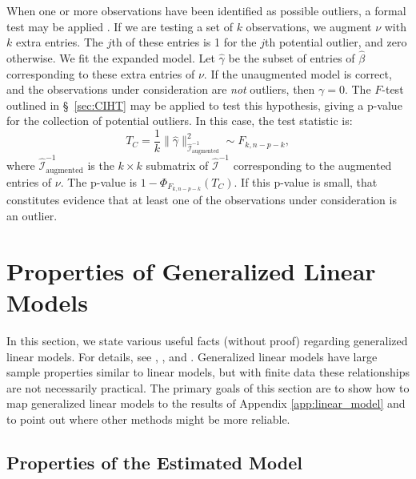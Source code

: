 \documentclass[12pt]{article}
\begin{document}
When one or more observations have been identified as possible outliers, a formal test may be applied \cite[\S~10.6.4]{Seber:2003}. If we are testing a set of $k$ observations, we augment $\nu$ with $k$ extra entries. The $j$th of these entries is 1 for the $j$th potential outlier, and zero otherwise. We fit the expanded model. Let $\hat{\gamma}$ be the subset of entries of $\hat{\beta}$ corresponding to these extra entries of $\nu$. If the unaugmented model is correct, and the observations under consideration are \textit{not} outliers, then $\gamma = 0$. The $F$-test outlined in \S~\ref{sec:CIHT} may be applied to test this hypothesis, giving a p-value for the collection of potential outliers. In this case, the test statistic is:
\begin{displaymath}
   T_C = \frac{1}{k} \| \hat{\gamma} \|_{\hat{\mathcal{I}}_{\textrm{augmented}}^{-1}}^2 \sim F_{k, n-p-k},
\end{displaymath}
where $\hat{\mathcal{I}}_{\textrm{augmented}}^{-1}$ is the $k \times k$ submatrix of $\hat{\mathcal{I}}^{-1}$ corresponding to the augmented entries of $\nu$. The p-value is $1 - \Phi_{F_{k, n-p-k}}(T_C)$. If this p-value is small, that constitutes evidence that at least one of the observations under consideration is an outlier.

\section{Properties of Generalized Linear Models}
\label{app:glm}

In this section, we state various useful facts (without proof) regarding generalized linear models. For details, see \cite{MN:1983}, \cite{Wood:2017}, and \cite{Agresti:2012}. Generalized linear models have large sample properties similar to linear models, but with finite data these relationships are not necessarily practical. The primary goals of this section are to show how to map generalized linear models to the results of Appendix \ref{app:linear_model} and to point out where other methods might be more reliable.

\subsection{Properties of the Estimated Model}
\end{document}
